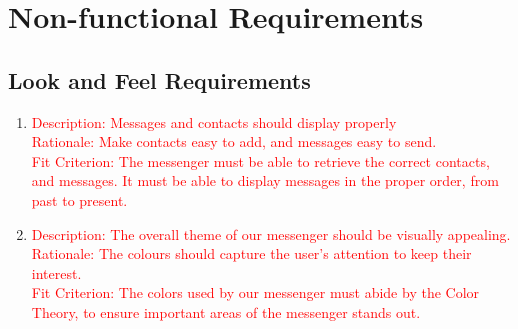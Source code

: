 \documentclass[12pt, titlepage]{article}
\begin{document}
		
	\newpage
\section{Non-functional Requirements}

    	\subsection{Look and Feel Requirements}
    	\begin{enumerate}
    	\item \textcolor{red}{Description: Messages and contacts should display properly \\
    		  Rationale: Make contacts easy to add, and messages easy to send. \\
    		  Fit Criterion: The messenger must be able to retrieve the correct contacts, and messages. It must be able to display messages in the proper order, from past to present.}
    		  
    	\item \textcolor{red}{Description: The overall theme of our messenger should be visually appealing. \\
    		  Rationale: The colours should capture the user's attention to keep their interest. \\
    		  Fit Criterion: The colors used by our messenger must abide by the Color Theory, to ensure important areas of the messenger stands out. }
    	\end{enumerate}
\end{document}
